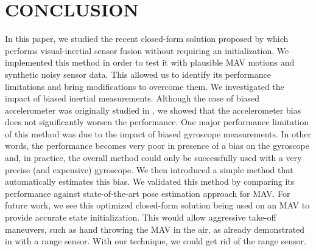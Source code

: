 \documentclass[letterpaper, 10 pt, conference]{ieeeconf}  %
\begin{document}
\section{CONCLUSION}\label{SectionConclusion}


In this paper, we studied the recent closed-form solution proposed by \cite{Martinelli2014} which performs visual-inertial sensor fusion without requiring an initialization.
We implemented this method in order to test it with plausible MAV motions and synthetic noisy sensor data.
This allowed us to identify its performance limitations and bring modifications to overcome them.
We investigated the impact of biased inertial measurements.
Although the case of biased accelerometer was originally studied in \cite{Martinelli2014}, we showed that the accelerometer bias does not significantly worsen the performance.
One major performance limitation of this method was due to the impact of biased gyroscope measurements.
In other words, the performance becomes very poor in presence of a bias on the gyroscope and, in practice, the overall method could only be successfully used with a very precise (and expensive) gyroscope.
We then introduced a simple method that automatically estimates this bias.
We validated this method by comparing its performance against state-of-the-art pose estimation approach for MAV.
For future work, we see this optimized closed-form solution being used on an MAV to provide accurate state initialization.
This would allow aggressive take-off maneuvers, such as hand throwing the MAV in the air, as already demonstrated in \cite{Faessler2015} with a range sensor.
With our technique, we could get rid of the range sensor.

\printbibliography
\end{document}
